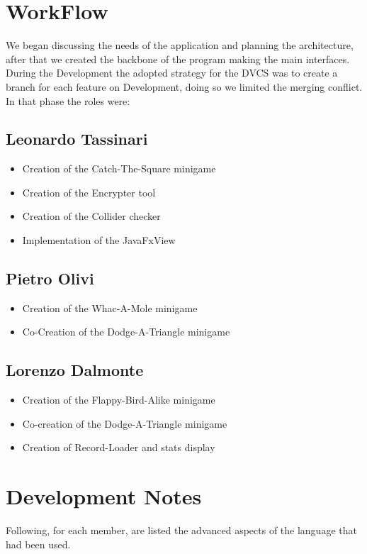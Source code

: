 \documentclass[a4paper,12pt]{report}
\begin{document}
\section{WorkFlow}
We began discussing the needs of the application and planning the architecture, after that we created the backbone of the program making the main interfaces.\\
During the Development the adopted strategy for the DVCS was to create a branch for each feature on Development, doing so we limited the merging conflict.
In that phase the roles were:
\subsection*{Leonardo Tassinari}
\begin{itemize}
	\item Creation of the Catch-The-Square minigame
	\item Creation of the Encrypter tool
	\item Creation of the Collider checker
	\item Implementation of the JavaFxView
\end{itemize}

\subsection*{Pietro Olivi}
\begin{itemize}
	\item Creation of the Whac-A-Mole minigame
	\item Co-Creation of the Dodge-A-Triangle minigame
\end{itemize}

\subsection*{Lorenzo Dalmonte}
\begin{itemize}
	\item Creation of the Flappy-Bird-Alike minigame
	\item Co-creation of the Dodge-A-Triangle minigame
	\item Creation of Record-Loader and stats display
\end{itemize}

\section{Development Notes}
Following, for each member, are listed the advanced aspects of the language that had been used.
\end{document}

